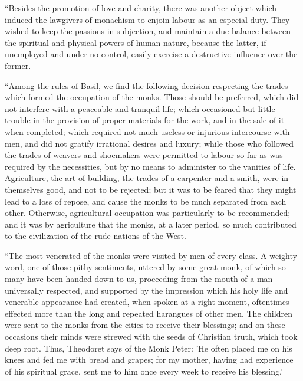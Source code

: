 ``Besides the promotion of love and charity, there
was another object which induced the lawgivers of
monachism to enjoin labour as an especial duty. They
wished to keep the passions in subjection, and maintain a
due balance between the spiritual and physical powers of
human nature, because the latter, if unemployed and under
no control, easily exercise a destructive influence over
the former.

``Among the rules of Basil, we find the following
decision respecting the trades which formed the
occupation of the monks. Those should be preferred, which
did not interfere with a peaceable and tranquil life;
which occasioned but little trouble in the provision of
proper materials for the work, and in the sale of it when
completed; which required not much useless or injurious
intercourse with men, and did not gratify irrational
desires and luxury; while those who followed the trades
of weavers and shoemakers were permitted to labour so far
as was required by the necessities, but by no means to
administer to the vanities of life. Agriculture, the art
of building, the trades of a carpenter and a smith, were
in themselves good, and not to be rejected; but it was to
be feared that they might lead to a loss of repose, and
cause the monks to be much separated from each other.
Otherwise, agricultural occupation was particularly to be
recommended; and it was by agriculture that the monks, at
a later period, so much contributed to the civilization
of the rude nations of the West.

``The most venerated of the monks were visited by
men of every class. A weighty word, one of those pithy
sentiments, uttered by some great monk, of which so many
have been handed down to us, proceeding from the mouth of
a man universally respected, and supported by the
impression which his holy life and venerable appearance
had created, when spoken at a right moment, oftentimes
effected more than the long and repeated harangues of
other men. The children were sent to the monks from the
cities to receive their blessings; and on these occasions
their minds were strewed with the seeds of Christian
truth, which took deep root. Thus, Theodoret says of the
Monk Peter: 'He often placed me on his knees and fed me
with bread and grapes; for my mother, having had
experience of his spiritual grace, sent me to him once
every week to receive his blessing.'

